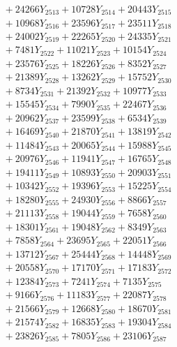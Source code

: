 \documentclass[a4paper,10pt]{article}
\begin{document}
{\begin{align}
&\;  + 24266 Y_{2513} + 10728 Y_{2514} + 20443 Y_{2515} \\[0.3ex]
&\;  + 10968 Y_{2516} + 23596 Y_{2517} + 23511 Y_{2518} \\[0.5ex]\allowbreak
&\;  + 24002 Y_{2519} + 22265 Y_{2520} + 24335 Y_{2521} \\[0.3ex]
&\;  + 7481 Y_{2522} + 11021 Y_{2523} + 10154 Y_{2524} \\[0.3ex]
&\;  + 23576 Y_{2525} + 18226 Y_{2526} + 8352 Y_{2527} \\[0.3ex]
&\;  + 21389 Y_{2528} + 13262 Y_{2529} + 15752 Y_{2530} \\[0.3ex]
&\;  + 8734 Y_{2531} + 21392 Y_{2532} + 10977 Y_{2533} \\[0.3ex]
&\;  + 15545 Y_{2534} + 7990 Y_{2535} + 22467 Y_{2536} \\[0.3ex]
&\;  + 20962 Y_{2537} + 23599 Y_{2538} + 6534 Y_{2539} \\[0.3ex]
&\;  + 16469 Y_{2540} + 21870 Y_{2541} + 13819 Y_{2542} \\[0.3ex]
&\;  + 11484 Y_{2543} + 20065 Y_{2544} + 15988 Y_{2545} \\[0.3ex]
&\;  + 20976 Y_{2546} + 11941 Y_{2547} + 16765 Y_{2548} \\[0.5ex]\allowbreak
&\;  + 19411 Y_{2549} + 10893 Y_{2550} + 20903 Y_{2551} \\[0.3ex]
&\;  + 10342 Y_{2552} + 19396 Y_{2553} + 15225 Y_{2554} \\[0.3ex]
&\;  + 18280 Y_{2555} + 24930 Y_{2556} + 8866 Y_{2557} \\[0.3ex]
&\;  + 21113 Y_{2558} + 19044 Y_{2559} + 7658 Y_{2560} \\[0.3ex]
&\;  + 18301 Y_{2561} + 19048 Y_{2562} + 8349 Y_{2563} \\[0.3ex]
&\;  + 7858 Y_{2564} + 23695 Y_{2565} + 22051 Y_{2566} \\[0.3ex]
&\;  + 13712 Y_{2567} + 25444 Y_{2568} + 14448 Y_{2569} \\[0.3ex]
&\;  + 20558 Y_{2570} + 17170 Y_{2571} + 17183 Y_{2572} \\[0.3ex]
&\;  + 12384 Y_{2573} + 7241 Y_{2574} + 7135 Y_{2575} \\[0.3ex]
&\;  + 9166 Y_{2576} + 11183 Y_{2577} + 22087 Y_{2578} \\[0.5ex]\allowbreak
&\;  + 21566 Y_{2579} + 12668 Y_{2580} + 18670 Y_{2581} \\[0.3ex]
&\;  + 21574 Y_{2582} + 16835 Y_{2583} + 19304 Y_{2584} \\[0.3ex]
&\;  + 23826 Y_{2585} + 7805 Y_{2586} + 23106 Y_{2587} \\[0.3ex]

\end{align}}
\end{document}
